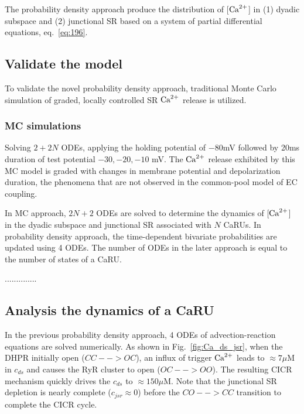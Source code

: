 The probability density approach produce the distribution of
[${\text{Ca}^{2+}}$] in (1) dyadic subspace and (2) junctional SR based on a
system of partial differential equations, eq.~\eqref{eq:196}.

\subsection{Validate the model}
\label{sec:validate-model}

To validate the novel probability density approach, traditional Monte
Carlo simulation of graded, locally controlled SR ${\text{Ca}^{2+}}$ release
is utilized.

\subsubsection{MC simulations}
\label{sec:mc-simulations}

Solving $2+2N$ ODEs, applying the holding potential of $-80$mV
followed by 20ms duration of test potential $-30, -20, -10$ mV. The
${\text{Ca}^{2+}}$ release exhibited by this MC model is graded with changes
in membrane potential and depolarization duration, the phenomena that
are not observed in the common-pool model of EC coupling.



In MC approach, $2N+2$ ODEs are solved to determine the dynamics of
[${\text{Ca}^{2+}}$] in the dyadic subspace and junctional SR associated with
$N$ CaRUs. In probability density approach, the time-dependent
bivariate probabilities are updated using 4 ODEs. The number of ODEs
in the later approach is equal to the number of states of a CaRU.


..............

\subsection{Analysis the dynamics of a CaRU}
\label{sec:analys-dynam-caru}

In the previous probability density approach, 4 ODEs of
advection-reaction equations are solved numerically. As shown in
Fig.~\ref{fig:Ca_ds_jsr}, when the DHPR initially open ($CC-->OC$), an
influx of trigger ${\text{Ca}^{2+}}$ leads to $\approx 7\mu$M in $c_{ds}$ and
causes the RyR cluster to open ($OC-->OO$). The resulting CICR
mechanism quickly drives the $c_{ds}$ to $\approx 150\mu$M. Note that
the junctional SR depletion is nearly complete ($c_{jsr}\approx 0$)
before the $CO-->CC$ transition to complete the CICR cycle. 

